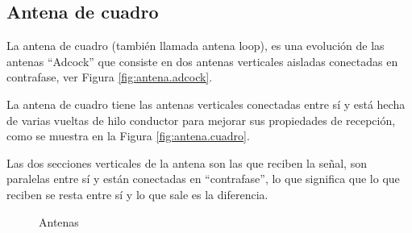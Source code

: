 \subsection{Antena de cuadro}
\label{sec:06.antena.de.cuadro}

La antena de cuadro (tambi\'en llamada antena loop), es una evoluci\'on de las antenas ``Adcock'' que consiste en dos antenas verticales aisladas conectadas en contrafase, ver Figura \ref{fig:antena.adcock}.

La antena de cuadro tiene las antenas verticales conectadas entre s\'i y est\'a hecha de varias vueltas de hilo conductor para mejorar sus propiedades de recepci\'on, como se muestra en la Figura \ref{fig:antena.cuadro}.

Las dos secciones verticales de la antena son las que reciben la se\~nal, son paralelas entre s\'i y est\'an conectadas en ``contrafase'', lo que significa que lo que reciben se resta entre s\'i y lo que sale es la diferencia.

\begin{figure}[!h]
  \centering
  \caption{Antenas}
\end{figure}




